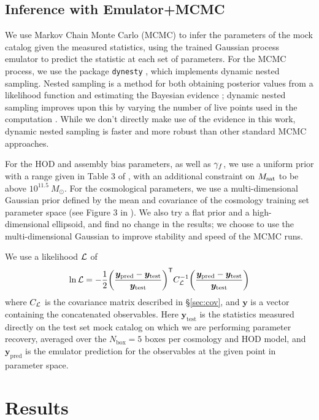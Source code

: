 \subsection{Inference with Emulator+MCMC}
\label{sec:inference}

We use Markov Chain Monte Carlo (MCMC) to infer the parameters of the mock catalog given the measured statistics, using the trained Gaussian process emulator to predict the statistic at each set of parameters.
For the MCMC process, we use the package \texttt{dynesty} \citep{Speagle2020}, which implements dynamic nested sampling.
Nested sampling is a method for both obtaining posterior values from a likelihood function and estimating the Bayesian evidence \citep{Skilling2006}; dynamic nested sampling improves upon this by varying the number of live points used in the computation \citep{Higson2019}.
While we don't directly make use of the evidence in this work, dynamic nested sampling is faster and more robust than other standard MCMC approaches.

For the HOD and assembly bias parameters, as well as $\gamma_f$, we use a uniform prior with a range given in Table 3 of \cite{Zhai2022}, with an additional constraint on $M_\mathrm{sat}$ to be above $10^{11.5} \: M_\odot$.
For the cosmological parameters, we use a multi-dimensional Gaussian prior defined by the mean and covariance of the cosmology training set parameter space (see Figure 3 in \citealt{DeRose2018}).
We also try a flat prior and a high-dimensional ellipsoid, and find no change in the results; we choose to use the multi-dimensional Gaussian to improve stability and speed of the MCMC runs.

We use a likelihood $\mathcal{L}$ of
\begin{equation}
    \mathrm{ln} \, \mathcal{L} = -\frac{1}{2} \bigg( \frac{\bm{y}_\mathrm{pred} - \bm{y}_\mathrm{test}}{\bm{y}_\mathrm{test}} \bigg)^{\mathsf{T}} C_{\mathcal{L}}^{-1} \bigg( \frac{\bm{y}_\mathrm{pred} - \bm{y}_\mathrm{test}}{\bm{y}_\mathrm{test}} \bigg)
\end{equation}
where $C_{\mathcal{L}}$ is the covariance matrix described in \S\ref{sec:cov}, and $\bm{y}$ is a vector containing the concatenated observables.
Here $\bm{y}_\mathrm{test}$ is the statistics measured directly on the test set mock catalog on which we are performing parameter recovery, averaged over the $N_\mathrm{box} = 5$ boxes per cosmology and HOD model, and $\bm{y}_\mathrm{pred}$ is the emulator prediction for the observables at the given point in parameter space. 


\section{Results}
\label{sec:results_aemulus}

